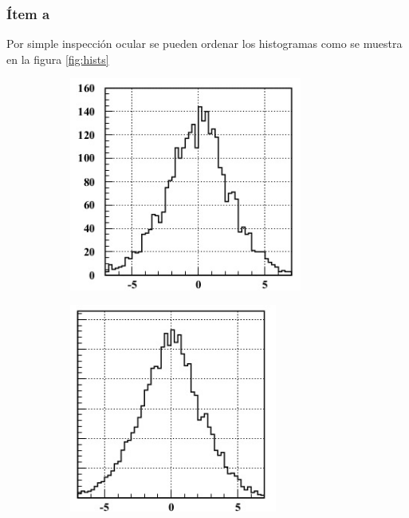 \subsubsection*{Ítem a}
Por simple inspección ocular se pueden ordenar los histogramas como se muestra en la figura \ref{fig:hists}
\begin{figure}
\centering
\begin{subfigure}[b]{0.3\textwidth}
\includegraphics[width=0.84\textwidth]{hist3.jpg}
\end{subfigure}
\begin{subfigure}[b]{0.3\textwidth}
\includegraphics[width=0.75\textwidth]{hist2.jpg}
\end{subfigure}

\end{figure}
